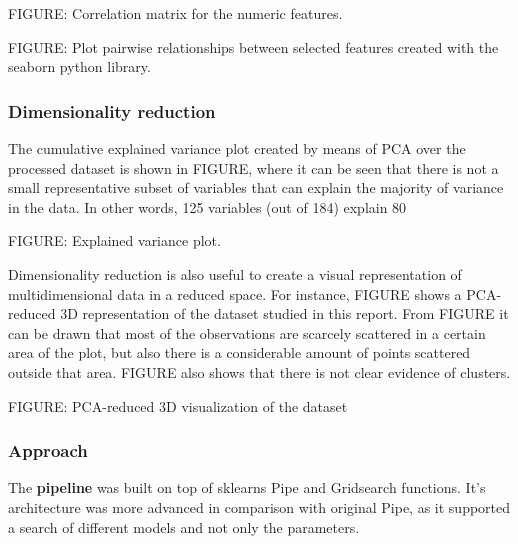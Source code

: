 FIGURE: Correlation matrix for the numeric features. 

FIGURE: Plot pairwise relationships between selected features created with the seaborn python library.


\subsubsection{Dimensionality reduction}
The cumulative explained variance plot created by means of PCA over the processed dataset is shown in FIGURE, where it can be seen that there is not a small representative subset of variables that can explain the majority of variance in the data. In other words, 125 variables (out of 184) explain 80%

FIGURE: Explained variance plot.



Dimensionality reduction is also useful to create a visual representation of multidimensional data in a reduced space. For instance, FIGURE shows a PCA-reduced 3D representation of the dataset studied in this report. From FIGURE it can be drawn that most of the observations are scarcely scattered in a certain area of the plot, but also there is a considerable amount of points scattered outside that area. FIGURE also shows that there is not clear evidence of clusters. 

FIGURE: PCA-reduced 3D visualization of the dataset

\subsubsection{Approach}
The \textbf{pipeline} was built on top of sklearns Pipe and Gridsearch functions. It’s architecture was more advanced in comparison with original Pipe, as it supported a search of different models and not only the parameters.

